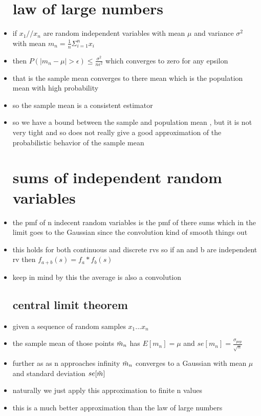 \documentclass{article}
\begin{document}
\begin{itemize}
\section{law of large numbers}
\item if $x_1//x_n$ are random independent variables with mean $\mu$ and variance $\sigma^2$ with mean $m_n=\frac{1}{n}\Sigma_{i=1}^{n} x_i$
\item then $P(|m_{n}-\mu|>\epsilon)\leq \frac{\sigma^2}{n\epsilon^2}$ which converges to zero for any epsilon
\item that is the sample mean converges to there mean which is the population mean with high probability 
\item so the sample mean is a consistent estimator
\item so we have a bound between the sample and population mean , but it is not very tight and so does not really give a good approximation of the probabilistic behavior of the sample mean 
\section{sums of independent random variables}
\item the pmf of n indecent random variables is the pmf of there sums which in the limit goes to the Gaussian since the convolution kind of smooth things out 
\item this holds for both continuous and discrete rvs so if an and b are independent rv then $f_{a+b}(s)=f_{a}*f_b(s)$
\item keep in mind by this the average is also a convolution 
\subsection{central limit theorem}
\item given a sequence of random samples $x_1...x_n$
\item the sample mean of those points $\Tilde{m}_n$ has $E[m_n]=\mu$ and $se[m_n]=\frac{\sigma_{pop}}{\sqrt{n}}$ 
\item further as as n approaches infinity $\Tilde{m}_n$ converges to a Gaussian with mean $\mu$ and standard deviation $se[\Tilde{m}]$
\item naturally we just apply this approximation to finite n values
\item this is a much better approximation than the law of large numbers

\end{itemize}
\end{document}
